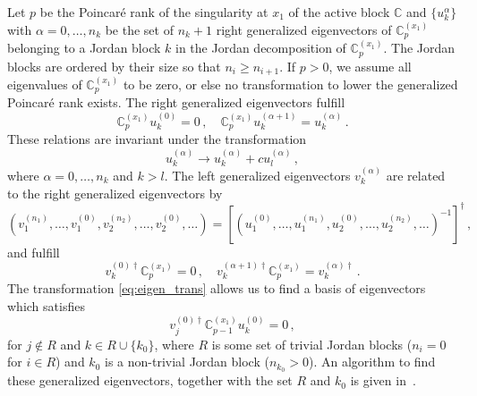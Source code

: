 \documentclass[12pt]{article}
\numberwithin{equation}{section}
\numberwithin{figure}{section}
\newcommand{\C}{\mathds{C}}
\begin{document}
        Let $p$ be the Poincar\'{e} rank of the singularity at $x_1$ of the active block $\C$ and $\{u_k^{\alpha}\}$ with $\alpha = 0,\dots,n_k$ be the set of $n_k+1$ right generalized eigenvectors of $\C_p^{(x_1)}$ belonging to a Jordan block $k$ in the Jordan decomposition of $\C_p^{(x_1)}$.
        The Jordan blocks are ordered by their size so that $n_i \geq n_{i+1}$.
        If $p>0$, we assume all eigenvalues of $\C_p^{(x_1)}$ to be zero, or else no transformation to lower the generalized Poincar\'{e} rank exists.
        The right generalized eigenvectors fulfill
        \[
          \C_p^{(x_1)} u_k^{(0)} = 0\,, \quad
          \C_p^{(x_1)} u_k^{(\alpha+1)} = u_k^{(\alpha)}\,.
        \]
        These relations are invariant under the transformation
        \begin{equation} \label{eq:eigen_trans}
          u_k^{(\alpha)} \rightarrow u_k^{(\alpha)} + cu_l^{(\alpha)}\,,
        \end{equation}
        where $\alpha=0,\dots,n_k$ and $k>l$.
        The left generalized eigenvectors $v_k^{(\alpha)}$ are related to the right generalized eigenvectors by
        \begin{equation} \label{eq:left_eigen}
          \left(
            v_1^{(n_1)},\dots,v_1^{(0)},
            v_2^{(n_2)},\dots,v_2^{(0)},
            \dots
          \right)
          =
          \left[
            \left(
              u_1^{(0)},\dots,u_1^{(n_1)},
              u_2^{(0)},\dots,u_2^{(n_2)},
              \dots
            \right)^{-1}
          \right]^\dagger\,,
        \end{equation}
        and fulfill
        \[
          v_k^{(0)\dagger} \C_p^{(x_1)} = 0\,, \quad
          v_k^{(\alpha+1)\dagger} \C_p^{(x_1)} = v_k^{(\alpha)\dagger}\,.
        \]
        The transformation \eqref{eq:eigen_trans} allows us to find a basis of eigenvectors which satisfies
        \begin{equation} \label{eq:eigen_cond}
          v_j^{(0)\dagger} \C_{p-1}^{(x_1)} u_k^{(0)} = 0\,,
        \end{equation}
        for $j \notin R$ and $k \in R \cup \{k_0\}$, where $R$ is some set of trivial Jordan blocks ($n_i = 0$ for $i\in R$) and $k_0$ is a non-trivial Jordan block ($n_{k_0} > 0$).
        An algorithm to find these generalized eigenvectors, together with the set $R$ and $k_0$ is given in~\cite{Lee:2014ioa}.
\end{document}
